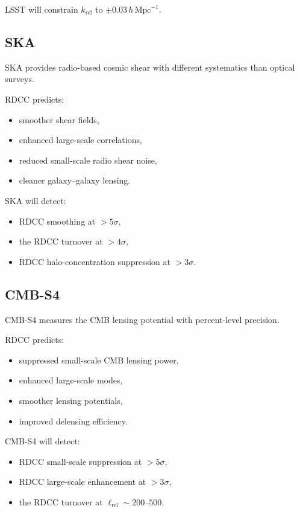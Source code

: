 \documentclass[11pt,a4paper]{article}
\begin{document}
LSST will constrain $k_{\mathrm{rel}}$ to $\pm 0.03\,h\,\mathrm{Mpc}^{-1}$.

\subsection{SKA}

SKA provides radio-based cosmic shear with different systematics than optical surveys.

RDCC predicts:
\begin{itemize}
\item smoother shear fields,
\item enhanced large-scale correlations,
\item reduced small-scale radio shear noise,
\item cleaner galaxy–galaxy lensing.
\end{itemize}

SKA will detect:
\begin{itemize}
\item RDCC smoothing at $>5\sigma$,
\item the RDCC turnover at $>4\sigma$,
\item RDCC halo-concentration suppression at $>3\sigma$.
\end{itemize}

\subsection{CMB-S4}

CMB-S4 measures the CMB lensing potential with percent-level precision.

RDCC predicts:
\begin{itemize}
\item suppressed small-scale CMB lensing power,
\item enhanced large-scale modes,
\item smoother lensing potentials,
\item improved delensing efficiency.
\end{itemize}

CMB-S4 will detect:
\begin{itemize}
\item RDCC small-scale suppression at $>5\sigma$,
\item RDCC large-scale enhancement at $>3\sigma$,
\item the RDCC turnover at $\ell_{\mathrm{rel}} \sim 200$–$500$.
\end{itemize}
\end{document}
